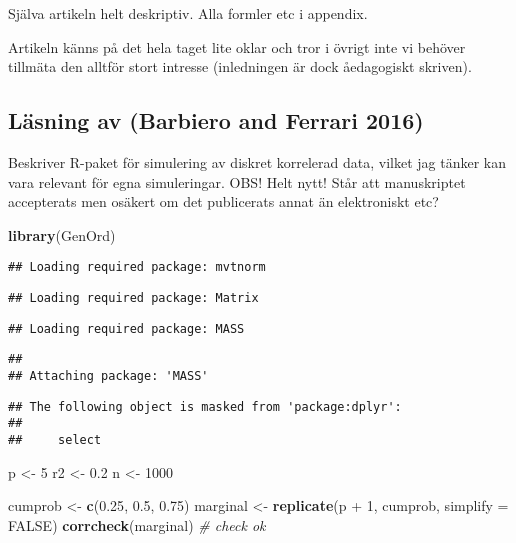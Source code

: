 \documentclass[]{article}
\newenvironment{Shaded}{\begin{snugshade}}{\end{snugshade}}
\newcommand{\KeywordTok}[1]{\textcolor[rgb]{0.13,0.29,0.53}{\textbf{{#1}}}}
\newcommand{\DataTypeTok}[1]{\textcolor[rgb]{0.13,0.29,0.53}{{#1}}}
\newcommand{\DecValTok}[1]{\textcolor[rgb]{0.00,0.00,0.81}{{#1}}}
\newcommand{\FloatTok}[1]{\textcolor[rgb]{0.00,0.00,0.81}{{#1}}}
\newcommand{\StringTok}[1]{\textcolor[rgb]{0.31,0.60,0.02}{{#1}}}
\newcommand{\CommentTok}[1]{\textcolor[rgb]{0.56,0.35,0.01}{\textit{{#1}}}}
\newcommand{\OtherTok}[1]{\textcolor[rgb]{0.56,0.35,0.01}{{#1}}}
\newcommand{\NormalTok}[1]{{#1}}
\begin{document}
Själva artikeln helt deskriptiv. Alla formler etc i appendix.

Artikeln känns på det hela taget lite oklar och tror i övrigt inte vi
behöver tillmäta den alltför stort intresse (inledningen är dock
åedagogiskt skriven).

\subsection{Läsning av (Barbiero and Ferrari
2016)}\label{lasning-av-barbiero2016}

Beskriver R-paket för simulering av diskret korrelerad data, vilket jag
tänker kan vara relevant för egna simuleringar. OBS! Helt nytt! Står att
manuskriptet accepterats men osäkert om det publicerats annat än
elektroniskt etc?

\begin{Shaded}
\begin{Highlighting}[]
\KeywordTok{library}\NormalTok{(GenOrd)}
\end{Highlighting}
\end{Shaded}

\begin{verbatim}
## Loading required package: mvtnorm
\end{verbatim}

\begin{verbatim}
## Loading required package: Matrix
\end{verbatim}

\begin{verbatim}
## Loading required package: MASS
\end{verbatim}

\begin{verbatim}
## 
## Attaching package: 'MASS'
\end{verbatim}

\begin{verbatim}
## The following object is masked from 'package:dplyr':
## 
##     select
\end{verbatim}

\begin{Shaded}
\begin{Highlighting}[]
\NormalTok{p <-}\StringTok{ }\DecValTok{5}
\NormalTok{r2 <-}\StringTok{ }\FloatTok{0.2}
\NormalTok{n <-}\StringTok{ }\DecValTok{1000}

\NormalTok{cumprob <-}\StringTok{ }\KeywordTok{c}\NormalTok{(}\FloatTok{0.25}\NormalTok{, }\FloatTok{0.5}\NormalTok{, }\FloatTok{0.75}\NormalTok{)}
\NormalTok{marginal <-}\StringTok{ }\KeywordTok{replicate}\NormalTok{(p +}\StringTok{ }\DecValTok{1}\NormalTok{, cumprob, }\DataTypeTok{simplify =} \OtherTok{FALSE}\NormalTok{)}
\KeywordTok{corrcheck}\NormalTok{(marginal) }\CommentTok{# check ok}
\end{Highlighting}
\end{Shaded}
\end{document}
